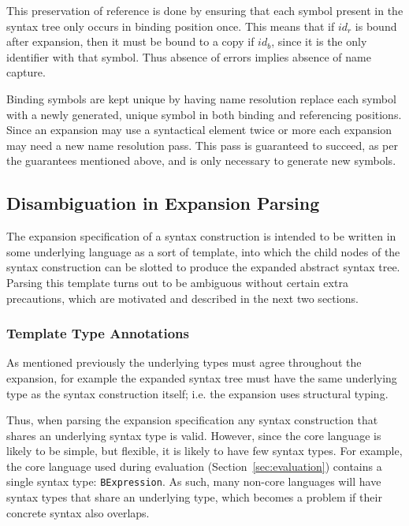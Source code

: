 \documentclass{kththesis}
\begin{document}
This preservation of reference is done by ensuring that each symbol present in the syntax tree only occurs in binding position once. This means that if $id_r$ is bound after expansion, then it must be bound to a copy if $id_b$, since it is the only identifier with that symbol. Thus absence of errors implies absence of name capture.

Binding symbols are kept unique by having name resolution replace each symbol with a newly generated, unique symbol in both binding and referencing positions. Since an expansion may use a syntactical element twice or more each expansion may need a new name resolution pass. This pass is guaranteed to succeed, as per the guarantees mentioned above, and is only necessary to generate new symbols.


\subsection{Disambiguation in Expansion Parsing} \label{sec:disambiguation-implementation}

The expansion specification of a syntax construction is intended to be written in some underlying language as a sort of template, into which the child nodes of the syntax construction can be slotted to produce the expanded abstract syntax tree. Parsing this template turns out to be ambiguous without certain extra precautions, which are motivated and described in the next two sections.

\subsubsection{Template Type Annotations}

As mentioned previously the underlying types must agree throughout the expansion, for example the expanded syntax tree must have the same underlying type as the syntax construction itself; i.e. the expansion uses structural typing.

Thus, when parsing the expansion specification any syntax construction that shares an underlying syntax type is valid. However, since the core language is likely to be simple, but flexible, it is likely to have few syntax types. For example, the core language used during evaluation (Section~\ref{sec:evaluation}) contains a single syntax type: \texttt{BExpression}. As such, many non-core languages will have syntax types that share an underlying type, which becomes a problem if their concrete syntax also overlaps.
\end{document}
